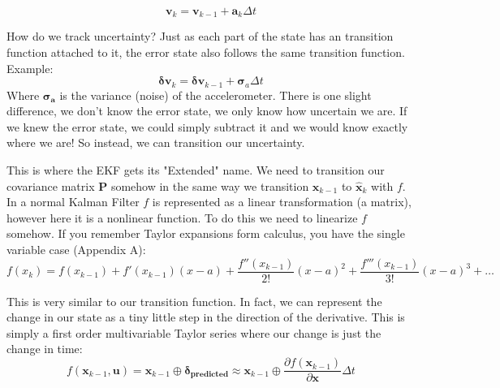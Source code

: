 \documentclass[11pt]{article}
\renewcommand{\vec}[1]{\mathbf{#1}}
\renewcommand{\tilde}[1]{\expandafter\hat{#1}}
\newcommand{\mat}[1]{\mathbf{#1}}
\begin{document}
$$\vec{v}_{k} = \vec{v}_{k-1} + \vec{a}_k\Delta t$$

How do we track uncertainty? Just as each part of the state has an transition function attached to it, the error state also follows the same transition function. Example:
$$\vec{\delta v}_k = \vec{\delta v}_{k-1} + \vec{\sigma}_a\Delta t$$
Where $\vec{\sigma_a}$ is the variance (noise) of the accelerometer. There is one slight difference, we don't know the error state, we only know how uncertain we are. If we knew the error state, we could simply subtract it and we would know exactly where we are! So instead, we can transition our uncertainty.

This is where the EKF gets its "Extended" name. We need to transition our covariance matrix $\mat{P}$ somehow in the same way we transition $\vec{x}_{k-1}$ to $\vec{\tilde{x}}_k$ with $f$. In a normal Kalman Filter $f$ is represented as a linear transformation (a matrix), however here it is a nonlinear function. To do this we need to linearize $f$ somehow. If you remember Taylor expansions form calculus, you have the single variable case (Appendix A):
$$f(x_k) = f(x_{k-1}) + f'(x_{k-1})(x-a) + \frac{f''(x_{k-1})}{2!}(x-a)^2 + \frac{f'''(x_{k-1})}{3!}(x-a)^3 + \dots$$

This is very similar to our transition function. In fact, we can represent the change in our state as a tiny little step in the direction of the derivative. This is simply a first order multivariable Taylor series where our change is just the change in time:
$$f(\vec{x}_{k-1}, \vec{u}) = \vec{x}_{k-1} \oplus \vec{\delta_{predicted}} \approx \vec{x}_{k-1} \oplus \frac{\partial f(\vec{x}_{k-1})}{\partial \vec{x}}\Delta t$$
\end{document}
